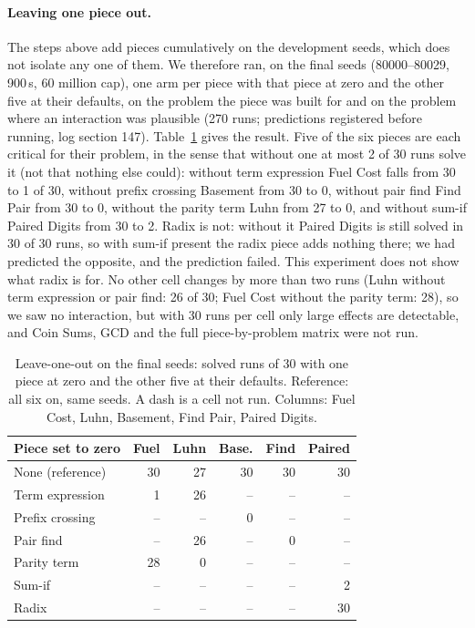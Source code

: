 \documentclass[sigconf,nonacm]{acmart}
\begin{document}
\paragraph{Leaving one piece out.}
The steps above add pieces cumulatively on the development seeds, which does not isolate any one of them. We therefore ran, on the final seeds (80000--80029, 900\,s, 60 million cap), one arm per piece with that piece at zero and the other five at their defaults, on the problem the piece was built for and on the problem where an interaction was plausible (270 runs; predictions registered before running, log section 147). Table~\ref{tab:loo} gives the result. Five of the six pieces are each critical for their problem, in the sense that without one at most 2 of 30 runs solve it (not that nothing else could): without term expression Fuel Cost falls from 30 to 1 of 30, without prefix crossing Basement from 30 to 0, without pair find Find Pair from 30 to 0, without the parity term Luhn from 27 to 0, and without sum-if Paired Digits from 30 to 2. Radix is not: without it Paired Digits is still solved in 30 of 30 runs, so with sum-if present the radix piece adds nothing there; we had predicted the opposite, and the prediction failed. This experiment does not show what radix is for. No other cell changes by more than two runs (Luhn without term expression or pair find: 26 of 30; Fuel Cost without the parity term: 28), so we saw no interaction, but with 30 runs per cell only large effects are detectable, and Coin Sums, GCD and the full piece-by-problem matrix were not run.
\begin{table}[t]
  \caption{Leave-one-out on the final seeds: solved runs of 30 with one piece at zero and the other five at their defaults. Reference: all six on, same seeds. A dash is a cell not run. Columns: Fuel Cost, Luhn, Basement, Find Pair, Paired Digits.}
  \label{tab:loo}
  \small
  \setlength{\tabcolsep}{3pt}
  \begin{tabular}{@{}lrrrrr@{}}
    \toprule
    Piece set to zero & Fuel & Luhn & Base. & Find & Paired \\
    \midrule
    None (reference) & 30 & 27 & 30 & 30 & 30 \\
    Term expression & 1 & 26 & -- & -- & -- \\
    Prefix crossing & -- & -- & 0 & -- & -- \\
    Pair find & -- & 26 & -- & 0 & -- \\
    Parity term & 28 & 0 & -- & -- & -- \\
    Sum-if & -- & -- & -- & -- & 2 \\
    Radix & -- & -- & -- & -- & 30 \\
    \bottomrule
  \end{tabular}
\end{table}
\end{document}

